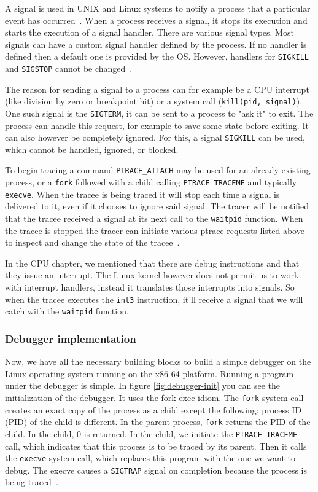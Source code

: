 A signal is used in UNIX and Linux systems to notify a process that a
particular event has occurred~\cite{os-concepts}. When a process receives a
signal, it stops its execution and starts the execution of a signal handler.
There are various signal types. Most signals can have a custom signal handler
defined by the process. If no handler is defined then a default one is provided
by the OS. However, handlers for \texttt{SIGKILL} and \texttt{SIGSTOP} cannot
be changed~\cite{signals}.

The reason for sending a signal to a process can for example be a CPU interrupt
(like division by zero or breakpoint hit) or a system call (\texttt{kill(pid,
signal)}). One such signal is the \texttt{SIGTERM}, it can be sent to a process
to "ask it" to exit. The process can handle this request, for example to save
some state before exiting. It can also however be completely ignored. For this,
a signal \texttt{SIGKILL} can be used, which cannot be handled, ignored, or
blocked.

To begin tracing a command \texttt{PTRACE\_ATTACH} may be used for an already
existing process, or a \texttt{fork} followed with a child calling
\texttt{PTRACE\_TRACEME} and typically \texttt{execve}. When the tracee is
being traced it will stop each time a signal is delivered to it, even if it
chooses to ignore said signal. The tracer will be notified that the tracee
received a signal at its next call to the \texttt{waitpid} function. When the
tracee is stopped the tracer can initiate various ptrace requests listed above
to inspect and change the state of the tracee~\cite{ptrace}.

In the CPU chapter, we mentioned that there are debug instructions and that
they issue an interrupt. The Linux kernel however does not permit us to work
with interrupt handlers, instead it translates those interrupts into signals.
So when the tracee executes the \texttt{int3} instruction, it'll receive
a signal that we will catch with the \texttt{waitpid} function.

\subsubsection{Debugger implementation}
Now, we have all the necessary building blocks to build a simple debugger on
the Linux operating system running on the x86-64 platform. Running a program
under the debugger is simple. In figure \ref{fig:debugger-init} you can see the
initialization of the debugger. It uses the fork-exec idiom. The \texttt{fork}
system call creates an exact copy of the process as a child except the
following: process ID (PID) of the child is different. In the parent process,
\texttt{fork} returns the PID of the child. In the child, $0$ is returned. In
the child, we initiate the \texttt{PTRACE\_TRACEME} call, which indicates that
this process is to be traced by its parent. Then it calls the \texttt{execve}
system call, which replaces this program with the one we want to debug. The
execve causes a \texttt{SIGTRAP} signal on completion because the process is
being traced~\cite{execve}.

